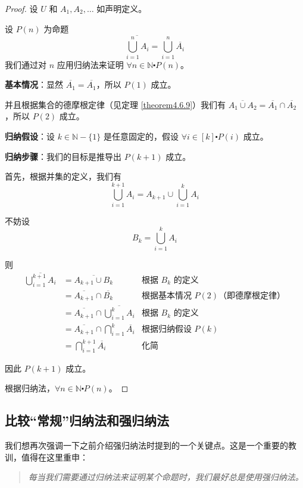 \begin{proof}
    设 $U$ 和 $A_1, A_2, \dots$ 如声明定义。

    设 $P(n)$ 为命题
    \[\overline{\bigcup_{i=1}^{n} A_i} = \bigcup_{i=1}^{n} \overline{A_i}\]
    我们通过对 $n$ 应用归纳法来证明 $\forall n \in \mathbb{N} \centerdot P(n)$。

    \textbf{基本情况}：显然 $\overline{A_1} = \overline{A_1}$，所以 $P(1)$ 成立。

    并且根据集合的德摩根定律（见定理 \ref{theorem4.6.9}）我们有 $\overline{A_1 \cup A_2} = \overline{A_1} \cap \overline{A_2}$，所以 $P(2)$ 成立。

    \textbf{归纳假设}：设 $k \in \mathbb{N}-\{1\}$ 是任意固定的，假设 $\forall i \in [k] \centerdot P(i)$ 成立。

    \textbf{归纳步骤}：我们的目标是推导出 $P(k+1)$ 成立。

    首先，根据并集的定义，我们有
    \[\bigcup_{i=1}^{k+1} A_i = A_{k+1} \cup \bigcup_{i=1}^k A_i\]

    不妨设
    \[B_k = \bigcup_{i=1}^k A_i\]

    则
    \begin{align*}
        \overline{\bigcup_{i=1}^{k+1} A_i} &= \overline{A_{k+1} \cup B_k} & \text{根据 } B_k \text{ 的定义} \\
        &= \overline{A_{k+1}} \cap \overline{B_k} & \text{根据基本情况 } P(2) \text{（即德摩根定律）}\\
        &= \overline{A_{k+1}} \cap \overline{\bigcup_{i=1}^k A_i} & \text{根据 } B_k \text{ 的定义} \\
        &= \overline{A_{k+1}} \cap \bigcap_{i=1}^k \overline{A_i} & \text{根据归纳假设 } P(k) \\
        &= \bigcap_{i=1}^{k+1} \overline{A_i} & \text{化简}
    \end{align*}

    因此 $P(k+1)$ 成立。

    根据归纳法，$\forall n \in \mathbb{N} \centerdot P(n)$。
\end{proof}

\subsection{比较``常规''归纳法和强归纳法}

我们想再次强调一下之前介绍强归纳法时提到的一个关键点。这是一个重要的教训，值得在这里重申：

\begin{quotation}
    \emph{每当我们需要通过归纳法来证明某个命题时，我们最好总是使用强归纳法。}
\end{quotation}

